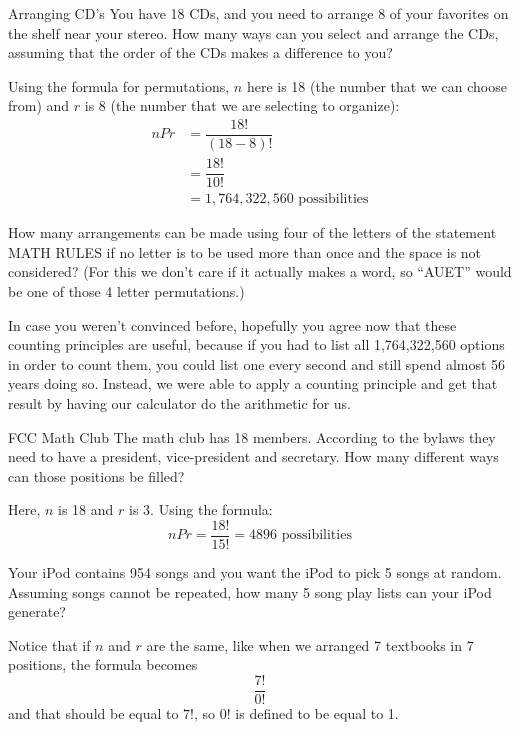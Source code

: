 \begin{example}[https://www.youtube.com/watch?v=vnvlFNwFUQc]{Arranging CD's}
You have 18 CDs, and you need to arrange 8 of your favorites on the shelf near your stereo.
How many ways can you select and arrange the CDs, assuming that the order of the CDs makes a
difference to you?

\sol
Using the formula for permutations, $n$ here is 18 (the number that we can choose from) and $r$ is 8 (the number that we are selecting to organize):
\begin{align*}
nPr &= \dfrac{18!}{(18-8)!}\\
&= \dfrac{18!}{10!}\\
&= \boxed{1,764,322,560 \textrm{ possibilities}}
\end{align*}
\end{example}

\begin{try}
How many arrangements can be made using four of the letters of the statement
MATH RULES if no letter is to be used more than once and the space is not considered? (For this we don't care if it
actually makes a word, so ``AUET'' would be one of those 4 letter permutations.)
\end{try}

In case you weren't convinced before, hopefully you agree now that these counting principles are useful, because if you had to list all 1,764,322,560 options in order to count them, you could list one every second and still spend almost 56 years doing so.  Instead, we were able to apply a counting principle and get that result by having our calculator do the arithmetic for us.
\pagebreak

\begin{example}[https://www.youtube.com/watch?v=XGwosYiNY2I]{FCC Math Club}
The math club has 18 members. According to the bylaws they need to have a president,
vice-president and secretary. How many different ways can those positions be filled?

\sol Here, $n$ is 18 and $r$ is 3.  Using the formula: \[nPr = \dfrac{18!}{15!} = \boxed{4896 \textrm{ possibilities}}\]
\end{example}

\begin{try}
Your iPod contains 954 songs and you want the iPod to pick 5 songs at random.
Assuming songs cannot be repeated, how many 5 song play lists can your iPod generate?
\end{try}

Notice that if $n$ and $r$ are the same, like when we arranged 7 textbooks in 7 positions, the formula becomes \[\dfrac{7!}{0!}\] and that should be equal to $7!$, so $0!$ is defined to be equal to 1.


